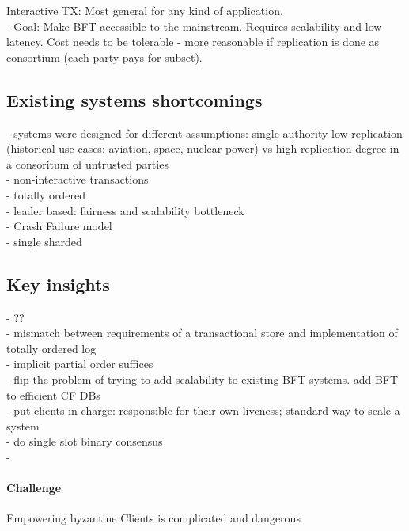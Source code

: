  Interactive TX: Most general for any kind of application.
\\
 - Goal: Make BFT accessible to the mainstream. Requires scalability and low latency. Cost needs to be tolerable - more reasonable if replication is done as consortium (each party pays for subset).
 

\subsection{Existing systems shortcomings}
- systems were designed for different assumptions: single authority low replication (historical use cases: aviation, space, nuclear power) vs high replication degree in a consoritum of untrusted parties\\
- non-interactive transactions\\
- totally ordered\\
- leader based: fairness and scalability bottleneck \\
- Crash Failure model\\
- single sharded\\

\subsection{Key insights}
- ?? \\
- mismatch between requirements of a transactional store and implementation of totally ordered log\\
- implicit partial order suffices \\
- flip the problem of trying to add scalability to existing BFT systems. add BFT to efficient CF DBs\\

- put clients in charge: responsible for their own liveness;  standard way to scale a system\\
- do single slot binary consensus\\
-
\paragraph{Challenge} Empowering byzantine Clients is complicated and dangerous


